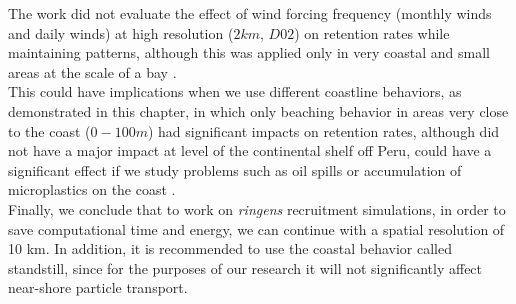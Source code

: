 The work did not evaluate the effect of wind forcing frequency (monthly winds and daily winds) at high resolution ($2 km$, $D02$) on retention rates while maintaining patterns, although this was applied only in very coastal and small areas at the scale of a bay \citep{FlorTam2019}.\\

This could have implications when we use different coastline behaviors, as demonstrated in this chapter, in which only beaching behavior in areas very close to the coast ($0 - 100 m$) had significant impacts on retention rates, although did not have a major impact at level of the continental shelf off Peru, could have a significant effect if we study problems such as oil spills or accumulation of microplastics on the coast \citep{AtwoFalc2019,LopeNajj2021}.\\

Finally, we conclude that to work on \textit{\gls{ringens}} recruitment simulations, in order to save computational time and energy, we can continue with a spatial resolution of 10 km. In addition, it is recommended to use the coastal behavior called standstill, since for the purposes of our research it will not significantly affect near-shore particle transport.\\

\clearpage
